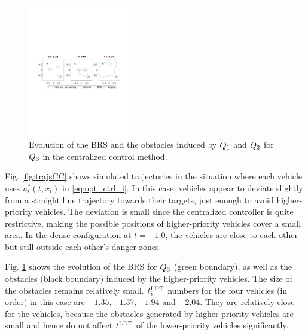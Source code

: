 \begin{figure}[H]
  \centering
  \includegraphics[width=0.4\textwidth]{"fig/cc_rs3"}
  \caption{Evolution of the BRS and the obstacles induced by $Q_1$ and $Q_2$ for $Q_3$ in the centralized control method.}
  \label{fig:cc_rs3}
\end{figure}
%
Fig. \ref{fig:trajsCC} shows simulated trajectories in the situation where each vehicle uses $u^*_i(t, x_i)$ in \eqref{eq:opt_ctrl_i}. In this case, vehicles appear to deviate slightly from a straight line trajectory towards their targets, just enough to avoid higher-priority vehicles. The deviation is small since the centralized controller is quite restrictive, making the possible positions of higher-priority vehicles cover a small area. In the dense configuration at $t=-1.0$, the vehicles are close to each other but still outside each other's danger zones.

Fig. \ref{fig:cc_rs3} shows the evolution of the BRS for $Q_3$ (green boundary), as well as the obstacles (black boundary) induced by the higher-priority vehicles. The size of the obstacles remains relatively small. $t^\text{LDT}_i$ numbers for the four vehicles (in order) in this case are $-1.35, -1.37, -1.94$ and $-2.04$. They are relatively close for the vehicles, because the obstacles generated by higher-priority vehicles are small and hence do not affect $t^\text{LDT}$ of the lower-priority vehicles significantly. 